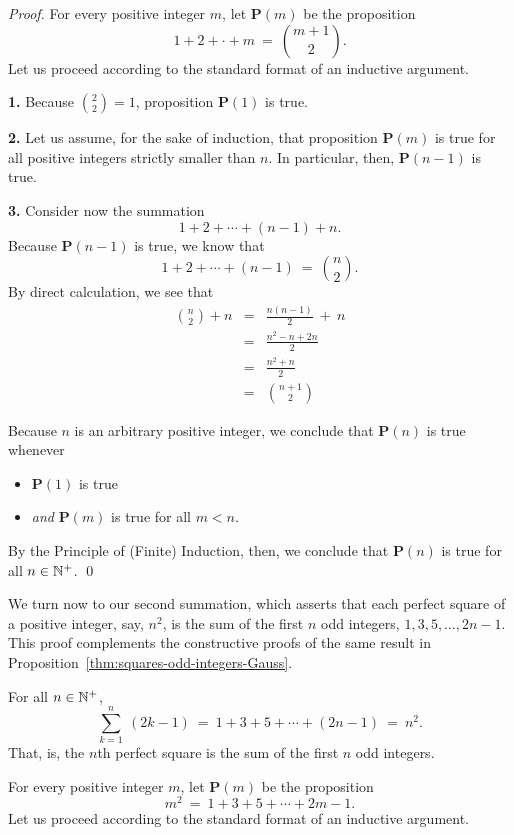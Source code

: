 \begin{proof}
For every positive integer $m$, let {\bf P}$(m)$ be the proposition
\[  1 + 2 + \cdot + m \ = \ {{m+1} \choose 2}. \]
Let us proceed according to the standard format of an inductive
argument.

{\bf 1.} Because ${\displaystyle {2 \choose 2}} = 1$, proposition {\bf
  P}$(1)$ is true.

{\bf 2.} Let us assume, for the sake of induction, that proposition
{\bf P}$(m)$ is true for all positive integers strictly smaller than
$n$.  In particular, then, {\bf P}$(n-1)$ is true.

{\bf 3.} Consider now the summation
\[ 1 + 2 + \cdots + (n-1) + n. \]
Because {\bf P}$(n-1)$ is true, we know that
\[ 1 + 2 + \cdots + (n-1) \ = \ {n \choose 2}.  \]
By direct calculation, we see that
\begin{eqnarray*}
{n \choose 2} + n
  & = & \frac{n(n-1)}{2}  \ + \ n \\ 
  & = & \frac{n^2 - n + 2n}{2} \\
  & = & \frac{n^2 + n}{2} \\
  & = & {{n+1} \choose 2}
\end{eqnarray*}

Because $n$ is an arbitrary positive integer, we conclude that
{\bf P}$(n)$ is true whenever
\begin{itemize}
\item
{\bf P}$(1)$ is true
\item
{\em and}
{\bf P}$(m)$ is true for all $m < n$.
\end{itemize}
By the Principle of (Finite) Induction, then, we conclude that {\bf
  P}$(n)$ is true for all $n \in \mathbb{N}^+$.
\qed
\end{proof}

\bigskip

We turn now to our second summation, which asserts that each perfect
square of a positive integer, say, $n^2$, is the sum of the first $n$
odd integers, $1, 3, 5, \ldots, 2n-1$.  This proof complements the
constructive proofs of the same result in
Proposition~\ref{thm:squares-odd-integers-Gauss}.

\begin{prop}
\label{thm:squares-odd-integers-induction1}
For all $n \in \mathbb{N}^+$,
\[
\sum_{k=1}^n \ (2k-1)
 \ = \ 1 + 3 + 5 + \cdots + (2n-1) \ = \ n^2.
\]
That, is, the $n$th perfect square is the sum of the first $n$ odd
integers.
\end{prop}

%
For every positive integer $m$, let {\bf P}$(m)$ be the proposition
\[ m^2 \ = \ 1 + 3 + 5 + \cdots + 2m-1. \]
Let us proceed according to the standard format of an inductive
argument.

